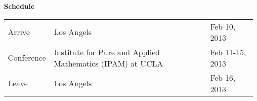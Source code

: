 \documentclass{article}
\begin{document}
\centering
\textbf{\Large{Schedule}}
\vspace{2cm}

%
%

\begin{tabular}{lll}
  Arrive            & Los Angels & Feb 10, 2013 \\
  Conference & Institute for Pure and Applied Mathematics (IPAM) at UCLA &  Feb 11-15, 2013 \\
  Leave             & Los Angels &Feb 16, 2013 \\
\end{tabular}
\end{document}
